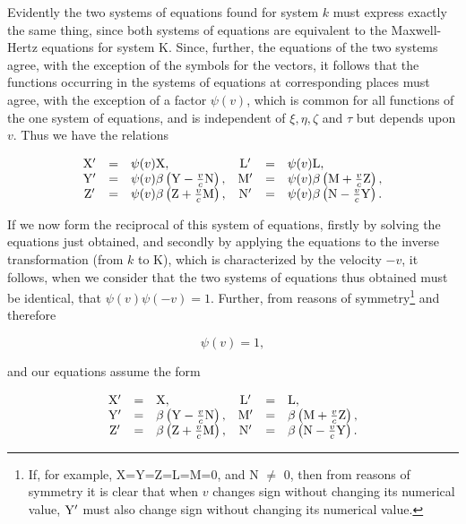 \documentclass{article}
\newcommand{\pr}[1]{${\rm #1}'$}
\begin{document}
Evidently the two systems of equations found for system $k$ must express
exactly the same thing, since both systems of equations are equivalent
to the Maxwell-Hertz equations for system K\@. Since, further, the
equations of the two systems agree, with the exception of the symbols
for the vectors, it follows that the functions occurring in the
systems of equations at corresponding places must agree, with the
exception of a factor $\psi(v)$, which is common for all functions of the
one system of equations, and is independent of
$\xi, \eta, \zeta$ and $\tau$ but depends
upon $v$.  Thus we have the relations

\[
\begin{array}{cclccl}
{\rm X'} & = & \psi(v){\rm X}, & {\rm L'} & = & \psi(v){\rm L}, \\
{\rm Y'} & = & \psi(v)\beta\left({\rm Y}-\frac{v}{c}{\rm N}\right), & {\rm M'} & = & \psi(v)\beta\left({\rm M}+\frac{v}{c}{\rm Z}\right), \\
{\rm Z'} & = & \psi(v)\beta\left({\rm Z}+\frac{v}{c}{\rm M}\right), & {\rm N'} & = & \psi(v)\beta\left({\rm N}-\frac{v}{c}{\rm Y}\right). \\
\end{array}
\]

If we now form the reciprocal of this system of equations,
firstly by solving the equations just obtained, and secondly by
applying the equations to the inverse transformation (from $k$ to
K), which is characterized by the velocity $-v$, it follows, when
we consider that the two systems of equations thus obtained must
be identical, that $\psi(v)\psi(-v)=1$.  Further, from reasons of
symmetry\footnote{If, for example, X=Y=Z=L=M=0, and N
$\ne$ 0, then from reasons of symmetry it is clear that when $v$
changes sign without changing its numerical value, \pr{Y} must also
change sign without changing its numerical value.}
and therefore

\[
\psi(v)=1,
\]

\noindent
and our equations assume the form 


\[
\begin{array}{cclccl}
{\rm X'} & = & {\rm X}, & {\rm L'} & = & {\rm L}, \\
{\rm Y'} & = & \beta\left({\rm Y}-\frac{v}{c}{\rm N}\right), & {\rm M'} & = & \beta\left({\rm M}+\frac{v}{c}{\rm Z}\right), \\
{\rm Z'} & = & \beta\left({\rm Z}+\frac{v}{c}{\rm M}\right), & {\rm N'} & = & \beta\left({\rm N}-\frac{v}{c}{\rm Y}\right). \\
\end{array}
\]
\end{document}
